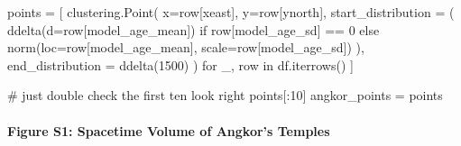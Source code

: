 \documentclass[
  11pt,
  letterpaper,
  DIV=11,
  numbers=noendperiod]{scrartcl}
\let\oldparagraph\paragraph
\renewcommand{\paragraph}[1]{\oldparagraph{#1}\mbox{}}
\newenvironment{Shaded}{\begin{snugshade}}{\end{snugshade}}
\newcommand{\CommentTok}[1]{\textcolor[rgb]{0.37,0.37,0.37}{#1}}
\newcommand{\ControlFlowTok}[1]{\textcolor[rgb]{0.00,0.23,0.31}{#1}}
\newcommand{\DecValTok}[1]{\textcolor[rgb]{0.68,0.00,0.00}{#1}}
\newcommand{\KeywordTok}[1]{\textcolor[rgb]{0.00,0.23,0.31}{#1}}
\newcommand{\NormalTok}[1]{\textcolor[rgb]{0.00,0.23,0.31}{#1}}
\newcommand{\OperatorTok}[1]{\textcolor[rgb]{0.37,0.37,0.37}{#1}}
\newcommand{\StringTok}[1]{\textcolor[rgb]{0.13,0.47,0.30}{#1}}
\begin{document}
\begin{Shaded}
\begin{Highlighting}[]
\NormalTok{points }\OperatorTok{=}\NormalTok{ [}
\NormalTok{    clustering.Point(}
\NormalTok{        x}\OperatorTok{=}\NormalTok{row[}\StringTok{\textquotesingle{}xeast\textquotesingle{}}\NormalTok{],}
\NormalTok{        y}\OperatorTok{=}\NormalTok{row[}\StringTok{\textquotesingle{}ynorth\textquotesingle{}}\NormalTok{],}
\NormalTok{        start\_distribution }\OperatorTok{=}\NormalTok{ (}
\NormalTok{            ddelta(d}\OperatorTok{=}\NormalTok{row[}\StringTok{\textquotesingle{}model\_age\_mean\textquotesingle{}}\NormalTok{]) }
            \ControlFlowTok{if}\NormalTok{ row[}\StringTok{\textquotesingle{}model\_age\_sd\textquotesingle{}}\NormalTok{] }\OperatorTok{==} \DecValTok{0} 
            \ControlFlowTok{else}\NormalTok{ norm(loc}\OperatorTok{=}\NormalTok{row[}\StringTok{\textquotesingle{}model\_age\_mean\textquotesingle{}}\NormalTok{], scale}\OperatorTok{=}\NormalTok{row[}\StringTok{\textquotesingle{}model\_age\_sd\textquotesingle{}}\NormalTok{])}
\NormalTok{            ),}
\NormalTok{        end\_distribution }\OperatorTok{=}\NormalTok{ ddelta(}\DecValTok{1500}\NormalTok{)}
\NormalTok{    )}
    \ControlFlowTok{for}\NormalTok{ \_, row }\KeywordTok{in}\NormalTok{ df.iterrows()}
\NormalTok{]}

\CommentTok{\# just double check the first ten look right}
\NormalTok{points[:}\DecValTok{10}\NormalTok{]}
\NormalTok{angkor\_points }\OperatorTok{=}\NormalTok{ points}
\end{Highlighting}
\end{Shaded}

\paragraph{Figure S1: Spacetime Volume of Angkor's
Temples}\label{figure-s1-spacetime-volume-of-angkors-temples}
\end{document}
